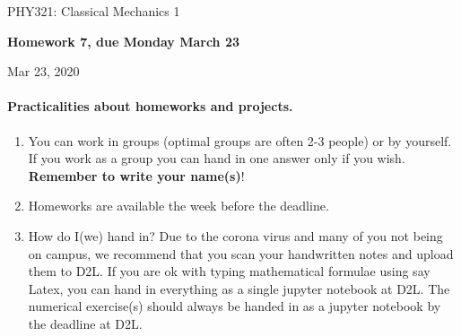 \documentclass[%
oneside,                 %
final,                   %
10pt]{article}
\begin{document}

\newcommand{\exercisesection}[1]{\subsection*{#1}}






\thispagestyle{empty}

\begin{center}
{\LARGE\bf
\begin{spacing}{1.25}
PHY321: Classical Mechanics 1
\end{spacing}
}
\end{center}


\begin{center}
{\bf Homework 7, due Monday  March 23${}^{}$} \\ [0mm]
\end{center}

\begin{center}
\end{center}
    

\begin{center}
Mar 23, 2020
\end{center}

\vspace{1cm}


\paragraph{Practicalities about  homeworks and projects.}
\begin{enumerate}
\item You can work in groups (optimal groups are often 2-3 people) or by yourself. If you work as a group you can hand in one answer only if you wish. \textbf{Remember to write your name(s)}!

\item Homeworks are available  the week before the deadline. 

\item How do I(we)  hand in?  Due to the corona virus and many of you not being on campus, we recommend that you scan your handwritten notes and upload them to D2L. If you are ok with typing mathematical formulae using say Latex, you can hand in everything as a single jupyter notebook at D2L. The numerical exercise(s) should always be handed in as a jupyter notebook by the deadline at D2L. 
\end{enumerate}
\end{document}
